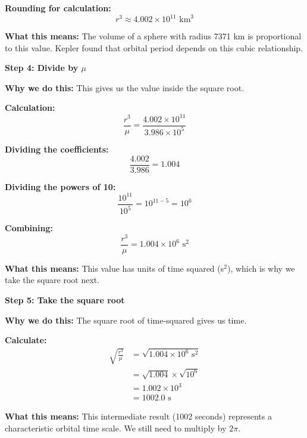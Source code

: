 \documentclass[11pt,letterpaper]{article}
\begin{document}
\textbf{Rounding for calculation:}
\begin{equation}
r^3 \approx 4.002 \times 10^{11} \text{ km}^3
\end{equation}

\textbf{What this means:} The volume of a sphere with radius 7371 km is proportional to this value. Kepler found that orbital period depends on this cubic relationship.

\vspace{0.3cm}

\textbf{Step 4: Divide by $\mu$}

\textbf{Why we do this:} This gives us the value inside the square root.

\textbf{Calculation:}
\begin{equation}
\frac{r^3}{\mu} = \frac{4.002 \times 10^{11}}{3.986 \times 10^5}
\end{equation}

\textbf{Dividing the coefficients:}
\begin{equation}
\frac{4.002}{3.986} = 1.004
\end{equation}

\textbf{Dividing the powers of 10:}
\begin{equation}
\frac{10^{11}}{10^5} = 10^{11-5} = 10^6
\end{equation}

\textbf{Combining:}
\begin{equation}
\frac{r^3}{\mu} = 1.004 \times 10^6 \text{ s}^2
\end{equation}

\textbf{What this means:} This value has units of time squared (s$^2$), which is why we take the square root next.

\vspace{0.3cm}

\textbf{Step 5: Take the square root}

\textbf{Why we do this:} The square root of time-squared gives us time.

\textbf{Calculate:}
\begin{align}
\sqrt{\frac{r^3}{\mu}} &= \sqrt{1.004 \times 10^6 \text{ s}^2} \\
&= \sqrt{1.004} \times \sqrt{10^6} \\
&= 1.002 \times 10^3 \\
&= 1002.0 \text{ s}
\end{align}

\textbf{What this means:} This intermediate result (1002 seconds) represents a characteristic orbital time scale. We still need to multiply by $2\pi$.
\end{document}
